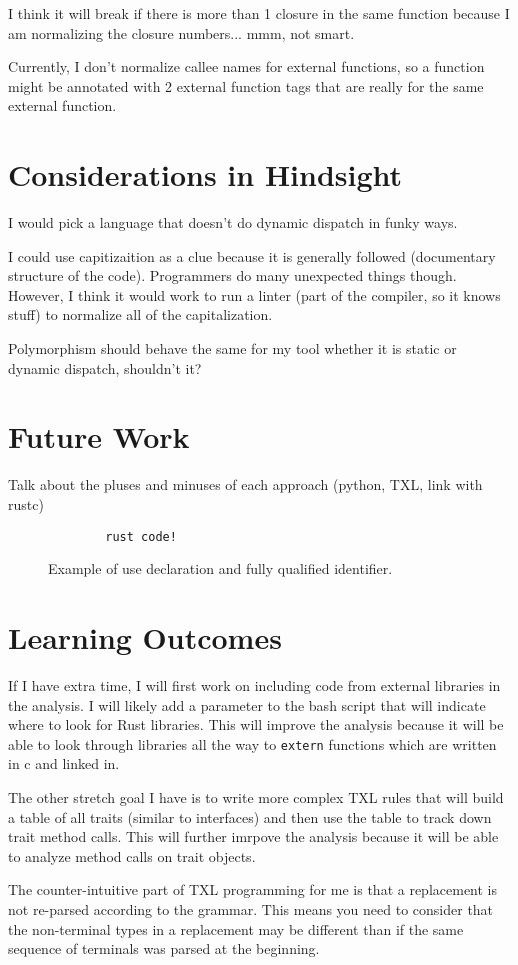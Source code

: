 \documentclass[11pt]{article}
\begin{document}
I think it will break if there is more than 1 closure in the same function because I am normalizing the closure numbers... mmm, not smart.

Currently, I don't normalize callee names for external functions, so a function might be annotated with 2 external function tags that are really for the same external function.

\section{Considerations in Hindsight}
I would pick a language that doesn't do dynamic dispatch in funky ways.

I could use capitizaition as a clue because it is generally followed (documentary structure of the code).
Programmers do many unexpected things though.
However, I think it would work to run a linter (part of the compiler, so it knows stuff) to normalize all of the capitalization.

Polymorphism should behave the same for my tool whether it is static or dynamic dispatch, shouldn't it?

\section{Future Work}

Talk about the pluses and minuses of each approach (python, TXL, link with rustc)


\begin{figure}
    \caption{Example of use declaration and fully qualified identifier.}
    \label{fig:qualifiers}
    \begin{lstlisting}
        rust code!
    \end{lstlisting}
\end{figure}

\section{Learning Outcomes}
If I have extra time, I will first work on including code from external libraries in the analysis.
I will likely add a parameter to the bash script that will indicate where to look for Rust libraries.
This will improve the analysis because it will be able to look through libraries all the way to \lstinline{extern} functions which are written in c and linked in.

The other stretch goal I have is to write more complex TXL rules that will build a table of all traits (similar to interfaces) and then use the table to track down trait method calls.
This will further imrpove the analysis because it will be able to analyze method calls on trait objects.

The counter-intuitive part of TXL programming for me is that a replacement is not re-parsed according to the grammar.
This means you need to consider that the non-terminal types in a replacement may be different than if the same sequence of terminals was parsed at the beginning.
\end{document}
